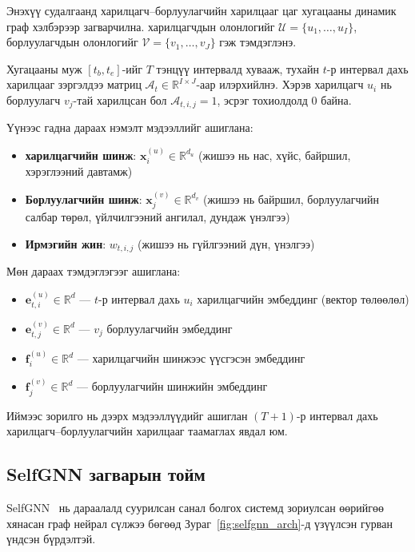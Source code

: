 \documentclass[conference]{IEEEtran}
\begin{document}
Энэхүү судалгаанд харилцагч–борлуулагчийн харилцааг цаг хугацааны динамик граф хэлбэрээр загварчилна. харилцагчдын олонлогийг $\mathcal{U} = \{u_1, \ldots, u_I\}$, борлуулагчдын олонлогийг $\mathcal{V} = \{v_1, \ldots, v_J\}$ гэж тэмдэглэнэ.

Хугацааны муж $[t_b, t_e]$-ийг $T$ тэнцүү интервалд хувааж, тухайн $t$-р интервал дахь харилцааг зэргэлдээ матриц $\mathcal{A}_t \in \mathbb{R}^{I \times J}$-аар илэрхийлнэ. Хэрэв харилцагч $u_i$ нь борлуулагч $v_j$-тай харилцсан бол $\mathcal{A}_{t,i,j} = 1$, эсрэг тохиолдолд $0$ байна.

Үүнээс гадна дараах нэмэлт мэдээллийг ашиглана:
\begin{itemize}
    \item \textbf{харилцагчийн шинж}: $\mathbf{x}_i^{(u)} \in \mathbb{R}^{d_u}$ (жишээ нь нас, хүйс, байршил, хэрэглээний давтамж)
    \item \textbf{Борлуулагчийн шинж}: $\mathbf{x}_j^{(v)} \in \mathbb{R}^{d_v}$ (жишээ нь байршил, борлуулагчийн салбар төрөл, үйлчилгээний ангилал, дундаж үнэлгээ)
    \item \textbf{Ирмэгийн жин}: $w_{t,i,j}$ (жишээ нь гүйлгээний дүн, үнэлгээ)
\end{itemize}

Мөн дараах тэмдэглэгээг ашиглана:
\begin{itemize}
    \item $\mathbf{e}_{t,i}^{(u)} \in \mathbb{R}^{d}$ — $t$-р интервал дахь  $u_i$ харилцагчийн эмбеддинг (вектор төлөөлөл)
    \item $\mathbf{e}_{t,j}^{(v)} \in \mathbb{R}^{d}$ — $v_j$ борлуулагчийн эмбеддинг
    \item $\mathbf{f}_i^{(u)} \in \mathbb{R}^{d}$ — харилцагчийн шинжээс үүсгэсэн эмбеддинг
    \item $\mathbf{f}_j^{(v)} \in \mathbb{R}^{d}$ — борлуулагчийн шинжийн эмбеддинг
\end{itemize}

Иймээс зорилго нь дээрх мэдээллүүдийг ашиглан $(T+1)$-р интервал дахь харилцагч–борлуулагчийн харилцааг таамаглах явдал юм.

\subsection{SelfGNN загварын тойм}
 
SelfGNN~\cite{selfgnn2024} нь дараалалд суурилсан санал болгох системд зориулсан өөрийгөө хянасан граф нейрал сүлжээ бөгөөд Зураг~\ref{fig:selfgnn_arch}-д үзүүлсэн гурван үндсэн бүрдэлтэй.
\end{document}
